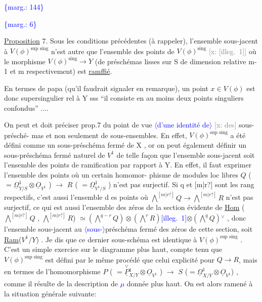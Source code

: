 \documentclass[11pt]{article}
\newcommand{\scanpage}[1]{\par\bigskip\noindent{\small\sffamily[scan #1]}\par}
\newcommand{\hand}[1]{\textcolor{blue}{#1}}
\newcommand{\inserted}[2][]{\textcolor{blue}{$\langle$#2$\rangle$}}
\newcommand{\margin}[1]{\textcolor{blue}{\{\textsf{marg.:} #1\}}}
\newcommand{\xout}[1]{\textcolor{gray}{[\textsf{x:} #1]}}
\newcommand{\uline}[1]{\underline{#1}}
\newcommand{\unsure}[1]{[#1?]}
\newcommand{\illegible}[1]{[\textsf{illeg.\ #1}]}
\begin{document}
\margin{144}

\clearpage
\scanpage{25/145}
\margin{6}

\uline{Proposition} 7. Sous les conditions précédentes (à rappeler), l'ensemble
sous-jacent à $V(\phi)^{\text{sup sing}}$ n'est autre que l'ensemble des points de
$V(\phi)^{\text{sing}}$ \xout{\illegible{1}} où le morphisme $V(\phi)^{\text{sing}}\longrightarrow Y$ (de préschémas lisses
sur S de dimension relative m-1 et m respectivement) est \uline{ramffié}.

En termes de papa (qu'il faudrait signaler en remarque), un point
$x \in V(\phi)$ est donc supersingulier rel à Y sss ``il consiste en au
moins deux points singuliers confondus'' ....

On peut et doit préciser prop.7 du point de vue \inserted{d'une identité de} \xout{des} sous-présché-%
mas et non seulement de sous-ensembles. En effet, $V(\phi)^{\text{sup sing}}$ a été
défini comme un sous-préschéma fermé de X , or on peut également définir
un sous-préschéma fermé naturel de $V^1$ de telle façon que l'ensemble
sous-jacent soit l'ensemble des points de ramification par rapport à Y.
En effet, il faut exprimer l'ensemble des points où un certain homomor-%
phisme de modules loc libres $Q$ ( $=\underline{\Omega}^1_{Y/S}\otimes\underline{O}_{V^1}$ ) $\longrightarrow$ $R$ ( $=\underline{\Omega}^1_{V^1/S}$ )
n'est pas surjectif. Si q et \unsure{m|r} sont les rang respectifs, c'est aussi
l'ensemble d es points où $\bigwedge^{\unsure{m|r}} Q \rightarrow \bigwedge^{\unsure{m|r}} R$ n'est pas surjectif, ce qui est
aussi l'ensemble des zéros de la section évidente de \uline{Hom} ( $\bigwedge^{\unsure{m|r}} Q$ , $\bigwedge^{\unsure{m|r}} R$)
$\simeq (\bigwedge^{q-r} Q)\otimes(\bigwedge^{r} R)$\hand{\illegible{1}}$\otimes(\bigwedge^{q} Q)$\hand{$^{\vee}$} , donc l'ensemble sous-jacent au \inserted{sous-}préschéma
fermé des zéros de cette section, soit \uline{Ram}($V^1/Y$) . Je dis que ce dernier
sous-schéma est identique à $V(\phi)^{\text{sup sing}}$ . C'est un simple exercice
sur le diagramme plus haut, compte tenu que $V(\phi)^{\text{sup sing}}$ est défini
par le même procédé que celui explicité pour $Q\longrightarrow R$, mais en termes de
l'homomorphisme $P$ ( $= \overset{\vee}{\underline{P}}{}^1_{X/Y}\otimes\underline{O}_{V^1}$ ) $\longrightarrow$ $S$ ($=\underline{\Omega}^1_{X/Y}\otimes\underline{O}_{V^1}$) , comme
il résulte de la description de \hand{$\mu$} donnée plus haut. On est alors
ramené à la situation générale suivante:
\end{document}
